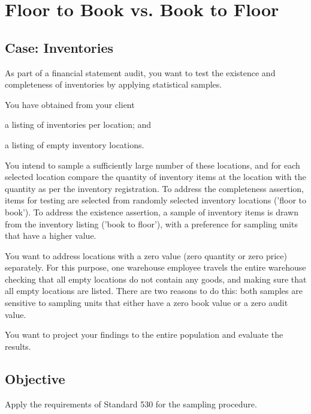 \documentclass[11pt,a4paper,openany]{memoir}
\begin{document}
\chapter{Floor to Book vs. Book to Floor}

\begin{mdframed}[hidealllines=true,backgroundcolor=gray!10, innerleftmargin=0.3cm]
\section*{Case: Inventories}
\RaggedRight

As part of a financial statement audit, you want to test the existence and completeness of inventories by applying statistical samples. 

You have obtained from your client 
\begin{compactitem}
	\item a listing of inventories per location; and
	\item a listing of empty inventory locations.
\end{compactitem}

\bigskip
You intend to sample a sufficiently large number of these locations, and for each selected location compare the quantity of inventory items at the location with the quantity as per the inventory registration. To address the completeness assertion, items for testing are selected from randomly selected inventory locations ('floor to book'). To address the existence assertion, a sample of inventory items is drawn from the inventory listing ('book to floor'), with a preference for sampling units that have a higher value.

You want to address locations with a zero value (zero quantity or zero price) separately. For this purpose, one warehouse employee travels the entire warehouse checking that all empty locations do not contain any goods, and making sure that all empty locations are listed. There are two reasons to do this: both samples are sensitive to sampling units that either have a zero book value or a zero audit value. 

You want to project your findings to the entire population and evaluate the results. 


\section*{Objective}
Apply the requirements of Standard 530 for the sampling procedure.
\end{mdframed}
\end{document}
